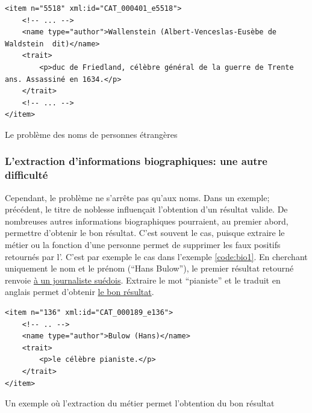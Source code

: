 \begin{listing}
	\begin{verbatim}
<item n="5518" xml:id="CAT_000401_e5518">
	<!-- ... -->
	<name type="author">Wallenstein (Albert-Venceslas-Eusèbe de Waldstein  dit)</name>
	<trait>
		<p>duc de Friedland, célèbre général de la guerre de Trente ans. Assassiné en 1634.</p>
	</trait>
	<!-- ... -->
</item>
	\end{verbatim}
	\caption{Le problème des noms de personnes étrangères}
	\label{code:name3}
\end{listing}

\subsubsection{L'extraction d'informations biographiques: une autre difficulté}
Cependant, le problème ne s'arrête pas qu'aux noms. Dans un exemple; précédent, le titre de noblesse influençait l'obtention d'un résultat valide. De nombreuses autres informations biographiques pourraient, au premier abord, permettre d'obtenir le bon résultat. C'est souvent le cas, puisque extraire le métier ou la fonction d'une personne permet de supprimer les faux positifs retournés par l'\api{}. C'est par exemple le cas dans l'exemple \ref{code:bio1}. En cherchant uniquement le nom et le prénom (\enquote{Hans Bulow}), le premier résultat retourné renvoie \href{https://www.wikidata.org/w/index.php?search=hans+bulow&title=Special:Search&profile=advanced&fulltext=1&ns0=1&ns120=1}{à un journaliste suédois}. Extraire le mot \enquote{pianiste} \ttrait{} et le traduit en anglais permet d'obtenir \href{https://www.wikidata.org/w/index.php?search=hans+bulow+pianist&title=Special:Search&profile=advanced&fulltext=1&ns0=1&ns120=1}{le bon résultat}.

\begin{listing}
	\begin{verbatim}
<item n="136" xml:id="CAT_000189_e136">
	<!-- .. -->
	<name type="author">Bulow (Hans)</name>
	<trait>
		<p>le célèbre pianiste.</p>
	</trait>
</item>
	\end{verbatim}
	\caption{Un exemple où l'extraction du métier permet l'obtention du bon résultat}
	\label{code:bio1}
\end{listing}


